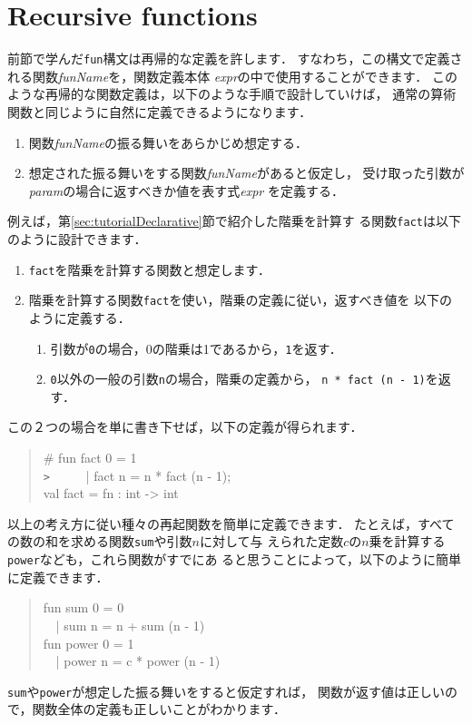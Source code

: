 \documentclass{jbook}
\newif\ifjp
\newcommand{\txt}[2]{#2}
\begin{document}
\fi%


\section{\txt{再帰的な関数}{Recursive functions}}
\label{sec:tutorialRecursion}

\ifjp%
	前節で学んだ{\tt fun}構文は再帰的な定義を許します．
	すなわち，この構文で定義される関数{\it funName}を，関数定義本体
{\it expr}の中で使用することができます．
	このような再帰的な関数定義は，以下のような手順で設計していけば，
通常の算術関数と同じように自然に定義できるようになります．
\begin{enumerate}
\item 関数{\it funName}の振る舞いをあらかじめ想定する．
\item 想定された振る舞いをする関数{\it funName}があると仮定し，
受け取った引数が{\it param}の場合に返すべきか値を表す式{\it expr}
を定義する．
\end{enumerate}
	例えば，第\ref{sec:tutorialDeclarative}節で紹介した階乗を計算す
る関数{\tt fact}は以下のように設計できます．
\begin{enumerate}
\item {\tt fact}を階乗を計算する関数と想定します．
\item 階乗を計算する関数{\tt fact}を使い，階乗の定義に従い，返すべき値を
以下のように定義する．
\begin{enumerate}
\item 引数が{\tt 0}の場合，0の階乗は1であるから，{\tt 1}を返す．
\item {\tt 0}以外の一般の引数{\tt n}の場合，階乗の定義から，
{\tt n * fact (n - 1)}を返す．
\end{enumerate}
\end{enumerate}
	この２つの場合を単に書き下せば，以下の定義が得られます．
\begin{tt}
\begin{quote}
\# fun fact 0 = 1\\
\verb|>| \ \ \ \ \ | fact n = n * fact (n - 1);\\
val fact = fn : int -> int
\end{quote}
\end{tt}

	以上の考え方に従い種々の再起関数を簡単に定義できます．
	たとえば，すべての数の和を求める関数{\tt sum}や引数$n$に対して与
えられた定数$c$の$n$乗を計算する{\tt power}なども，これら関数がすでにあ
ると思うことによって，以下のように簡単に定義できます．
\begin{tt}
\begin{quote}
fun sum 0 = 0\\
\ \ | sum n = n + sum (n - 1)\\
fun power 0 = 1\\
\ \ | power n = c * power (n - 1)
\end{quote}
\end{tt}
	{\tt sum}や{\tt power}が想定した振る舞いをすると仮定すれば，
関数が返す値は正しいので，関数全体の定義も正しいことがわかります．
\end{document}

